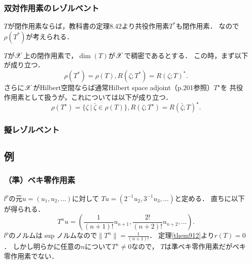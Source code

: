    \subsubsection{双対作用素のレゾルベント}
    $T$が閉作用素ならば，教科書の定理8.42より共役作用素$T^*$も閉作用素．
    なので$\rho(T^*)$が考えられる．
    \begin{Them}[定理9.9, p.213] \label{them909}
        $T$が$\mathscr{X}$上の閉作用素で，$\dim(T)$が$\mathscr{X}$で稠密であるとする．
        この時，まず以下が成り立つ．
        \[ \rho(T^*)=\rho(T), R(\zeta;T^*)=R(\zeta;T)^*. \]
        さらに$\mathscr{X}$がHilbert空間ならば通常Hilbert space adjoint（p.201参照）$T^{\star}$を
        共役作用素として扱うが，これについては以下が成り立つ．
        \[ \rho(T^{\star})=\{ \zeta ~|~ \bar{\zeta} \in \rho(T)\}, R(\zeta;T^{\star})=R(\bar{\zeta};T)^{\star}. \]
    \end{Them}

    \subsubsection{擬レゾルベント}

    \subsection{例}
        \subsubsection{（準）ベキ零作用素}
        \begin{Example}[例9.14, p.216]
            $l^p$の元$u=(u_1,u_2,\dots)$に対して
            $Tu=(2^{-1}u_2, 3^{-1}u_3, \dots)$と定める．
            直ちに以下が得られる．
            \[ T^n u=\left( \frac{1}{(n+1)!} u_{n+1}, \frac{2!}{(n+2)!} u_{n+2}, \dots \right). \]
            $l^p$のノルムは$\sup$ノルムなので$\|T^n\|=\frac{1}{(n+1)!}$．
            定理\ref{them912}より$r(T)=0$．
            しかし明らかに任意の$n$について$T^n \neq 0$なので，
            $T$は準ベキ零作用素だがベキ零作用素でない．
        \end{Example}

